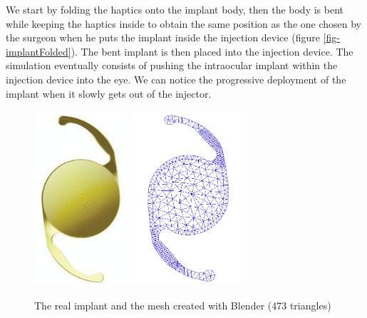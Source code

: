 \documentclass{llncs}
\begin{document}
We start by folding the haptics onto the implant body, then the body is bent while keeping the haptics inside to obtain the same position as the one chosen by the surgeon when he puts the implant inside the injection device (figure \ref{fig-implantFolded}). The bent implant is then placed into the injection device. The simulation eventually consists of pushing the intraocular implant within the injection device into the eye. We can notice the progressive deployment of the implant when it slowly gets out of the injector. 

\begin{figure}[!h]
\begin{center}
\includegraphics[height=6.5cm]{images/IOL}
\hspace{1cm}
\includegraphics[height=6.5cm]{images/mesh_implant}
\caption [Lens implant and its mesh] {The real implant and the mesh created with Blender (473 triangles)}
\label{fig-implant}
\end{center}
\end{figure}
\end{document}

